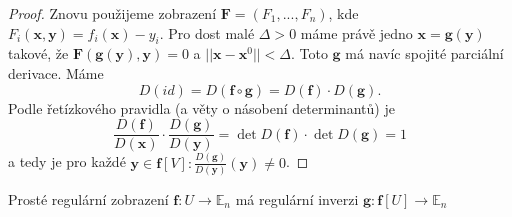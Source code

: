 \documentclass[../main.tex]{subfiles}
\begin{document}
\begin{proof}
	Znovu použijeme zobrazení $\textbf{F} = (F_1,...,F_n)$, kde $F_i(\textbf{x},\textbf{y}) = f_i(\textbf{x})-y_i$. Pro dost malé 
	$\Delta > 0$ máme právě jedno $\textbf{x} = \textbf{g}(\textbf{y})$ takové, že $\textbf{F}(\mathbf{g}(\textbf{y}),\textbf{y}) = 0$ a $||\textbf{x} - \textbf{x}^0|| < \Delta$.
	Toto $\textbf{g}$ má navíc spojité parciální derivace. Máme
	\[D(id) = D(\textbf{f}\circ\textbf{g}) = D(\textbf{f})\cdot D(\textbf{g}).\]
	Podle řetízkového pravidla (a věty o násobení determinantů) je 
	\[\frac{D(\textbf{f})}{D(\textbf{x})}\cdot\frac{D(\textbf{g})}{D(\textbf{y})} = \det D(\textbf{f})\cdot \det D(\textbf{g}) = 1\]
	a tedy je pro každé $\textbf{y} \in \textbf{f}[V] \colon \frac{D(\textbf{g})}{D(\textbf{y})}(\textbf{y}) \neq 0$.
\end{proof}

\begin{consequence}
	Prosté regulární zobrazení $\mathbf{f}: U \to \mathbb{E}_n$ má regulární inverzi
	$\mathbf{g}: \mathbf{f}[U] \to \mathbb{E}_n$
\end{consequence}
\end{document}
